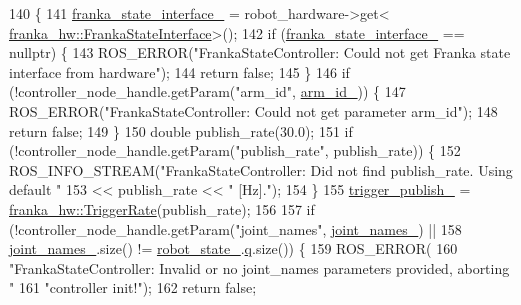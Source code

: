 \begin{DoxyCode}
140                                                                         \{
141   \hyperlink{classfranka__control_1_1FrankaStateController_a3691177b860e7ea1bcaa323ccdfa86d0}{franka\_state\_interface\_} = robot\_hardware->get<
      \hyperlink{classfranka__hw_1_1FrankaStateInterface}{franka\_hw::FrankaStateInterface}>();
142   \textcolor{keywordflow}{if} (\hyperlink{classfranka__control_1_1FrankaStateController_a3691177b860e7ea1bcaa323ccdfa86d0}{franka\_state\_interface\_} == \textcolor{keyword}{nullptr}) \{
143     ROS\_ERROR(\textcolor{stringliteral}{"FrankaStateController: Could not get Franka state interface from hardware"});
144     \textcolor{keywordflow}{return} \textcolor{keyword}{false};
145   \}
146   \textcolor{keywordflow}{if} (!controller\_node\_handle.getParam(\textcolor{stringliteral}{"arm\_id"}, \hyperlink{classfranka__control_1_1FrankaStateController_a603d865facc13c7b1f2ebb5a27404221}{arm\_id\_})) \{
147     ROS\_ERROR(\textcolor{stringliteral}{"FrankaStateController: Could not get parameter arm\_id"});
148     \textcolor{keywordflow}{return} \textcolor{keyword}{false};
149   \}
150   \textcolor{keywordtype}{double} publish\_rate(30.0);
151   \textcolor{keywordflow}{if} (!controller\_node\_handle.getParam(\textcolor{stringliteral}{"publish\_rate"}, publish\_rate)) \{
152     ROS\_INFO\_STREAM(\textcolor{stringliteral}{"FrankaStateController: Did not find publish\_rate. Using default "}
153                     << publish\_rate << \textcolor{stringliteral}{" [Hz]."});
154   \}
155   \hyperlink{classfranka__control_1_1FrankaStateController_a1c903d6812d02a29796d64b0fc3eb51d}{trigger\_publish\_} = \hyperlink{classfranka__hw_1_1TriggerRate}{franka\_hw::TriggerRate}(publish\_rate);
156 
157   \textcolor{keywordflow}{if} (!controller\_node\_handle.getParam(\textcolor{stringliteral}{"joint\_names"}, \hyperlink{classfranka__control_1_1FrankaStateController_afb6dc481c4d282d5f8f830f0cf943404}{joint\_names\_}) ||
158       \hyperlink{classfranka__control_1_1FrankaStateController_afb6dc481c4d282d5f8f830f0cf943404}{joint\_names\_}.size() != \hyperlink{classfranka__control_1_1FrankaStateController_a0d097abb2665aadbc8d38662bba5ae8b}{robot\_state\_}.\hyperlink{structfranka_1_1RobotState_ade3335d1ac2f6c44741a916d565f7091}{q}.size()) \{
159     ROS\_ERROR(
160         \textcolor{stringliteral}{"FrankaStateController: Invalid or no joint\_names parameters provided, aborting "}
161         \textcolor{stringliteral}{"controller init!"});
162     \textcolor{keywordflow}{return} \textcolor{keyword}{false};

\end{DoxyCode}
